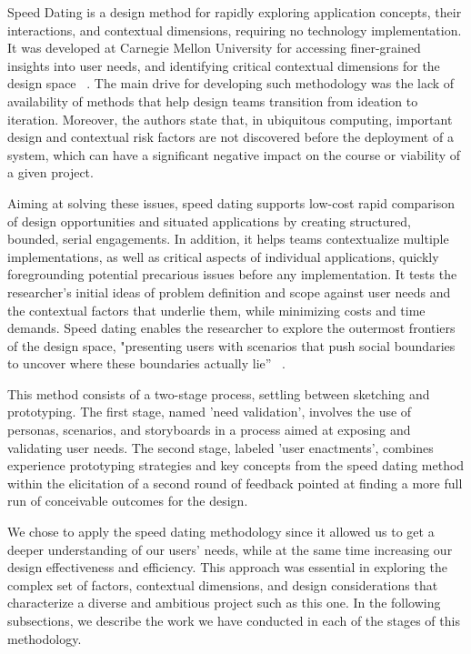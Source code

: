 \label{sec:speeddating}

Speed Dating is a design method for rapidly exploring application concepts, their interactions, and contextual dimensions, requiring no technology implementation. It was developed at Carnegie Mellon University for accessing finer-grained insights into user needs, and identifying critical contextual dimensions for the design space ~\cite{Davidoff2007}. The main drive for developing such methodology was the lack of availability of methods that help design teams transition from ideation to iteration. Moreover, the authors state that, in ubiquitous computing, important design and contextual risk factors are not discovered before the deployment of a system, which can have a significant negative impact on the course or viability of a given project.

Aiming at solving these issues, speed dating supports low-cost rapid comparison of design opportunities and situated applications by creating structured, bounded, serial engagements. In addition, it helps teams contextualize multiple implementations, as well as critical aspects of individual applications, quickly foregrounding potential precarious issues before any implementation. It tests the researcher's initial ideas of problem definition and scope against user needs and the contextual factors that underlie them, while minimizing costs and time demands. Speed dating enables the researcher to explore the outermost frontiers of the design space, "presenting users with scenarios that push social boundaries to uncover where these boundaries actually lie” ~\cite{Davidoff2007}.

This method consists of a two-stage process, settling between sketching and prototyping. The first stage, named 'need validation', involves the use of personas, scenarios, and storyboards in a process aimed at exposing and validating user needs. The second stage, labeled 'user enactments', combines experience prototyping strategies and key concepts from the speed dating method within the elicitation of a second round of feedback pointed at finding a more full run of conceivable outcomes for the design.

We chose to apply the speed dating methodology since it allowed us to get a deeper understanding of our users' needs, while at the same time increasing our design effectiveness and efficiency. This approach was essential in exploring the complex set of factors, contextual dimensions, and design considerations that characterize a diverse and ambitious project such as this one. In the following subsections, we describe the work we have conducted in each of the stages of this methodology.

